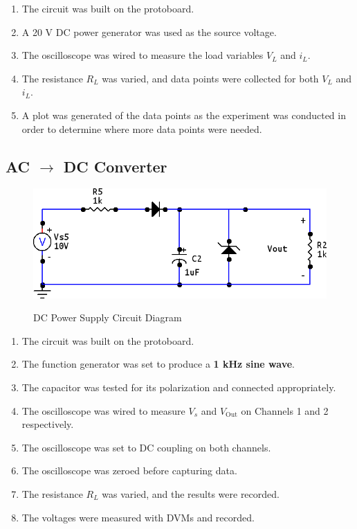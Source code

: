\documentclass[twocolumn,english]{IEEEtran}
\begin{document}
  \begin{enumerate}
   \item The circuit was built on the protoboard. %
   \item A 20 V DC power generator was used as the source voltage.
   \item The oscilloscope was wired to measure the load variables $V_L$ and $i_L$.
   \item The resistance $R_L$ was varied, and data points were collected for both $V_L$ and $i_L$.
   \item A plot was generated of the data points as the experiment was conducted in order to determine where more data points were needed.
  \end{enumerate}

\subsection{AC $\rightarrow$ DC Converter} %
\begin{figure}[h!]
  \begin{centering}
  \begin{center}
  \includegraphics[width=\linewidth]{./acdc_circuit_diag.png}
  \label{fig:acdc_circuit_diag}
  \caption{DC Power Supply Circuit Diagram}
  \end{center}
  \par\end{centering}
  \end{figure}

  \begin{enumerate}
    \item The circuit was built on the protoboard. %
    \item The function generator was set to produce a \textbf{1 kHz sine wave}.
    \item The capacitor was tested for its polarization and connected appropriately.
    \item The oscilloscope was wired to measure $V_s$ and $V_{\text{Out}}$ on Channels 1 and 2 respectively.
    \item The oscilloscope was set to DC coupling on both channels.
    \item The oscilloscope was zeroed before capturing data. %
    \item The resistance $R_L$ was varied, and the results were recorded.
    \item The voltages were measured with DVMs and recorded. %
  \end{enumerate}
\end{document}
